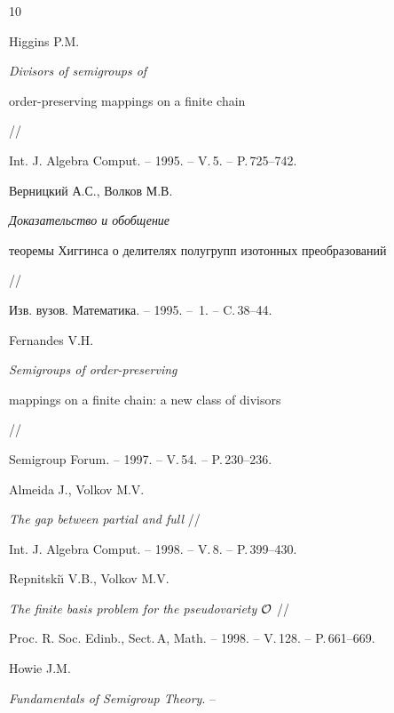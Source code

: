 \begin{thebibliography}{10}







Higgins P.M.


{\it Divisors of semigroups of


order-preserving mappings on a finite chain} //


Int. J. Algebra Comput. -- 1995. -- V.\,5. -- P.\,725--742.







Верницкий А.С., Волков М.В. 


{\it Доказательство и обобщение


теоремы Хиггинса о делителях полугрупп изотонных преобразований} //


Изв. вузов. Математика. -- 1995. -- \No\,1. -- C.\,38--44.







Fernandes V.H.


{\it Semigroups of order-preserving


mappings on a finite chain: a new class of divisors} //


Semigroup Forum. -- 1997. -- V.\,54. -- P.\,230--236.







Almeida J., Volkov M.V.


{\it The gap between partial and full} //


Int. J. Algebra Comput. -- 1998. -- V.\,8. -- P.\,399--430.







Repnitski\u{\i} V.B., Volkov M.V.


{\it The finite basis problem for the pseudovariety $\cal O$} //


Proc. R. Soc. Edinb., Sect.\,A, Math. -- 1998. -- V.\,128. -- P.\,661--669.







Howie J.M.


{\it Fundamentals of Semigroup Theory}. --



\end{thebibliography}
